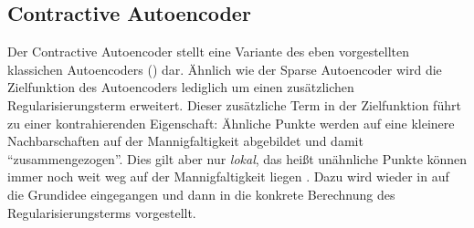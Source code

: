 
\subsection{Contractive Autoencoder}
\label{ch:MethodenDerDimRed:ML:CAE}

Der Contractive Autoencoder \parencite{Rifai.2011} stellt eine Variante des eben vorgestellten klassichen Autoencoders
() dar. Ähnlich wie der Sparse Autoencoder wird die
Zielfunktion des Autoencoders lediglich um einen zusätzlichen Regularisierungsterm erweitert.
Dieser zusätzliche Term in der Zielfunktion führt zu einer kontrahierenden Eigenschaft: Ähnliche
Punkte werden auf eine kleinere Nachbarschaften auf der Mannigfaltigkeit abgebildet und damit
\enquote{zusammengezogen}. Dies gilt aber nur \textit{lokal}, das heißt unähnliche Punkte können
immer noch weit weg auf der Mannigfaltigkeit liegen \parencite[521]{Goodfellow.2016}. Dazu wird wieder in 
auf die Grundidee eingegangen und dann in 
die konkrete Berechnung des Regularisierungsterms vorgestellt.

